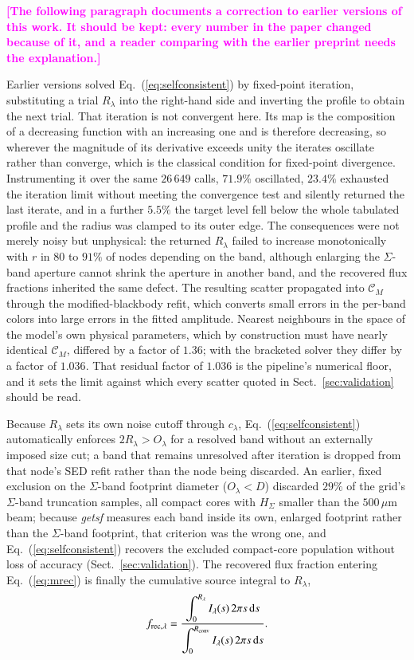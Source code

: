 \documentclass{aa}
\newcommand{\draftnote}[1]{\textcolor{magenta}{\textbf{[#1]}}}
\newcommand{\CM}{\mathcal{C}_{M}}
\begin{document}
\draftnote{The following paragraph documents a correction to earlier versions of
this work. It should be kept: every number in the paper changed because of
it, and a reader comparing with the earlier preprint needs the explanation.}

Earlier versions solved Eq.~(\ref{eq:selfconsistent}) by fixed-point
iteration, substituting a trial $R_\lambda$ into the right-hand side and
inverting the profile to obtain the next trial. That iteration is not
convergent here. Its map is the composition of a decreasing function with an
increasing one and is therefore decreasing, so wherever the magnitude of its
derivative exceeds unity the iterates oscillate rather than converge, which
is the classical condition for fixed-point divergence. Instrumenting it over
the same $26\,649$ calls, $71.9\%$ oscillated, $23.4\%$ exhausted the
iteration limit without meeting the convergence test and silently returned
the last iterate, and in a further $5.5\%$ the target level fell below the
whole tabulated profile and the radius was clamped to its outer edge. The
consequences were not merely noisy but unphysical: the returned $R_\lambda$
failed to increase monotonically with $r$ in $80$ to $91\%$ of nodes
depending on the band, although enlarging the $\Sigma$-band aperture cannot
shrink the aperture in another band, and the recovered flux fractions
inherited the same defect. The resulting scatter propagated into $\CM$
through the modified-blackbody refit, which converts small errors in the
per-band colors into large errors in the fitted amplitude. Nearest
neighbours in the space of the model's own physical parameters, which by
construction must have nearly identical $\CM$, differed by a factor of
$1.36$; with the bracketed solver they differ by a factor of $1.036$. That
residual factor of $1.036$ is the pipeline's numerical floor, and it sets
the limit against which every scatter quoted in Sect.~\ref{sec:validation}
should be read.

Because $R_\lambda$ sets its own noise cutoff through
$c_\lambda$, Eq.~(\ref{eq:selfconsistent}) automatically enforces
$2R_\lambda>O_\lambda$ for a resolved band without an
externally imposed size cut; a band that remains unresolved after
iteration is dropped from that node's SED refit rather than the node being
discarded. An earlier, fixed exclusion on the $\Sigma$-band footprint diameter
($O_\lambda<D$) discarded $29\%$ of the grid's $\Sigma$-band
truncation samples, all compact cores with $H_\Sigma$ smaller
than the $500\,\mu$m beam; because \emph{getsf} measures each band inside
its own, enlarged footprint rather than the $\Sigma$-band footprint, that
criterion was the wrong one, and Eq.~(\ref{eq:selfconsistent}) recovers the
excluded compact-core population without loss of accuracy
(Sect.~\ref{sec:validation}). The recovered flux fraction entering
Eq.~(\ref{eq:mrec}) is finally the cumulative source integral to
$R_\lambda$,
\begin{equation}
  f_{{{\rm rec}},\lambda} = \frac{\displaystyle\int_0^{R_\lambda}
    I_\lambda(s)\,2\pi s\,{\rm d}s}
    {\displaystyle\int_0^{R_{\rm conv}} I_\lambda(s)\,2\pi s\,
     {\rm d}s}.
  \label{eq:frac}
\end{equation}
\end{document}
